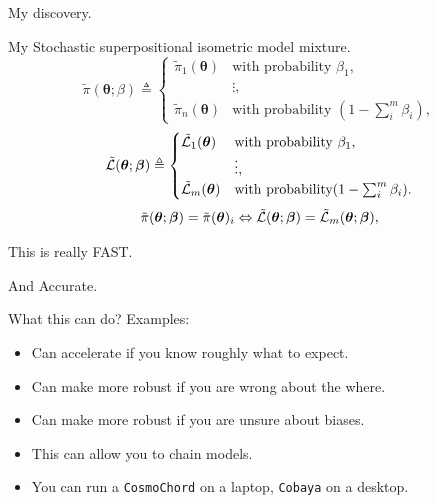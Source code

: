 \documentclass[bigger]{beamer}
\begin{document}
\begin{frame}[label={sec:orgb21b8c0}]{My discovery.}
\begin{block}{My Stochastic superpositional isometric model mixture.}
\begin{equation*}
  \tilde{\pi}(\bm{\theta}; \beta)  \triangleq \begin{cases}
	\tilde{\pi}_{1}(\bm{\theta}) & \text{with probability } \beta_{1},\\
	& \vdots,\\
	\tilde{\pi}_{n}(\bm{\theta}) & \text{with probability } (1- \sum_{i}^{m}\beta_{i}),
	\end{cases}
\end{equation*}
\begin{equation*}
  \tilde{\cal L}(\bm{\theta}; \bm{\beta})  \triangleq
  \begin{cases}
	\tilde{\cal L}_{1}(\bm{\theta}) &  \text{with probability } \beta_{1},\\
		    &\vdots,\\
	\tilde{\cal L}_{m}(\bm{\theta}) & \text{with probability} (1- \sum_{i}^{m}\beta_{i}).
\end{cases}
\end{equation*}
\begin{equation*}
  \tilde{\pi}(\bm{\theta}; \bm{\beta}) = \tilde{\pi}(\bm{\theta})_{i} \Leftrightarrow \tilde{\cal L}(\bm{\theta}; \bm{\beta}) = \tilde{\cal L}_{m}(\bm{\theta}; \bm{\beta}), 
\end{equation*}
\end{block}
\end{frame}

\begin{frame}[label={sec:orgcde55a9}]{This is really FAST.}
\begin{figure}

\end{figure}
\end{frame}

\begin{frame}[label={sec:org34912c4}]{And Accurate.}
\begin{figure}

\end{figure}
\end{frame}

\begin{frame}[fragile,label={sec:org7a68446}]{What this can do?}
 Examples: 
\begin{itemize}
\item Can accelerate if you know \alert{roughly} what to expect.
\item Can make more robust if you are wrong about the where.
\item Can make more robust if you are unsure about biases.
\item This can allow you to chain models.
\item You can run a \texttt{CosmoChord} on a laptop, \texttt{Cobaya} on a desktop.
\end{itemize}
\end{frame}
\end{document}
